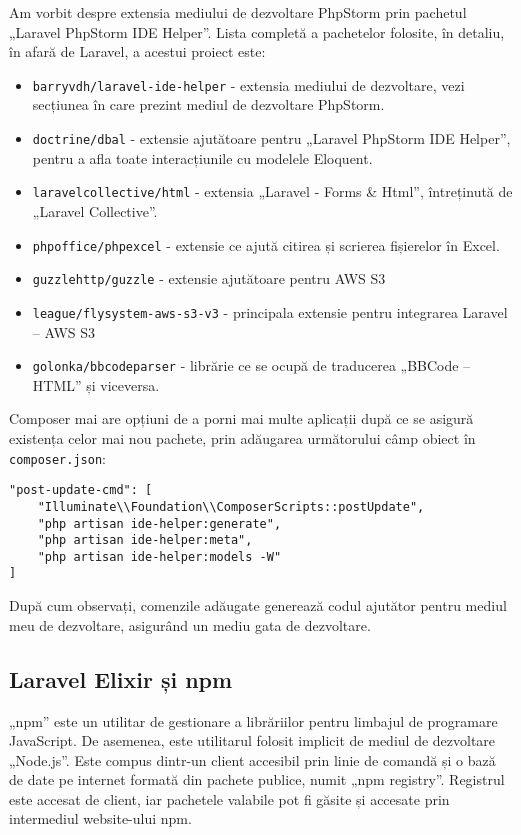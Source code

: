 		Am vorbit despre extensia mediului de dezvoltare PhpStorm prin pachetul „Laravel PhpStorm IDE Helper”.
		Lista completă a pachetelor folosite, în detaliu, în afară de Laravel, a acestui proiect este:

		\begin{itemize}
			\item \verb|barryvdh/laravel-ide-helper| - extensia mediului de dezvoltare, vezi secțiunea în care prezint mediul de dezvoltare PhpStorm.
			\item \verb|doctrine/dbal| - extensie ajutătoare pentru „Laravel PhpStorm IDE Helper”, pentru a afla toate interacțiunile cu modelele Eloquent.
			\item \verb|laravelcollective/html| - extensia „Laravel - Forms \& Html”, întreținută de „Laravel Collective”.
			\item \verb|phpoffice/phpexcel| - extensie ce ajută citirea și scrierea fișierelor în Excel.
			\item \verb|guzzlehttp/guzzle| - extensie ajutătoare pentru AWS S3
			\item \verb|league/flysystem-aws-s3-v3| - principala extensie pentru integrarea Laravel -- AWS S3
			\item \verb|golonka/bbcodeparser| - librărie ce se ocupă de traducerea „BBCode -- HTML” și viceversa.
		\end{itemize}

		Composer mai are opțiuni de a porni mai multe aplicații după ce se asigură existența celor mai nou pachete, prin adăugarea următorului câmp obiect în \verb|composer.json|:
		\begin{Verbatim}
"post-update-cmd": [
	"Illuminate\\Foundation\\ComposerScripts::postUpdate",
	"php artisan ide-helper:generate",
	"php artisan ide-helper:meta",
	"php artisan ide-helper:models -W"
]
	\end{Verbatim}
	După cum observați, comenzile adăugate generează codul ajutător pentru mediul meu de dezvoltare, asigurând un mediu gata de dezvoltare.

	\subsection{Laravel Elixir și npm}

		„npm” este un utilitar de gestionare a librăriilor pentru limbajul de programare JavaScript.
		De asemenea, este utilitarul folosit implicit de mediul de dezvoltare „Node.js”.
		Este compus dintr-un client accesibil prin linie de comandă și o bază de date pe internet formată din pachete publice, numit „npm registry”.
		Registrul este accesat de client, iar pachetele valabile pot fi găsite și accesate prin intermediul website-ului npm.\cite{npm}

